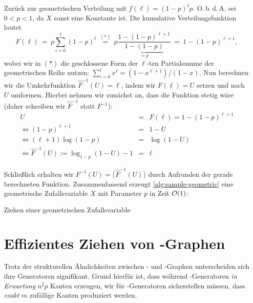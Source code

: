 Zurück  zur geometrischen Verteilung mit $f(\ell) = (1-p)^\ell p$.
O.\,b.\,d.\,A. sei $0 < p < 1$, da $X$ sonst eine Konstante ist.
Die kumulative Verteilungsfunktion lautet
\begin{equation}
    F(\ell)
    \ =\ p \sum_{i=0}^\ell (1-p)^\ell
    \ \stackrel{(*)}{=} \ p \frac{1 - (1-p)^{\ell+1}}{\underbrace{1 - (1-p)}_{=p}}
    \ = \ 1 - (1-p)^{\ell+1},
\end{equation}
wobei wir in $(*)$ die geschlossene Form der $\ell$-ten Partialsumme der geometrischen Reihe nutzen: $\sum_{i=0}^\ell x^\ell = (1 - x^{\ell+1})/(1 - x)$.
Nun berechnen wir die Umkehrfunktion $\hat F^{-1}(U) = \ell$, indem wir $F(\ell) = U$ setzen und nach $U$ umformen.
Hierbei nehmen wir zunächst an, dass die Funktion stetig wäre (daher schreiben wir $\hat F ^{-1}$ statt $F^{-1}$):
\begin{eqnarray}
    U &=& F(\ell) = 1 - (1-p)^{\ell+1} \\
    \Leftrightarrow (1-p)^{\ell+1} &=& 1 - U \\
    \Leftrightarrow  (\ell+1) \log(1-p)  &=& \log(1 - U) \\
    \Leftrightarrow  \hat F^{-1}(U) := \log_{1-p}(1 - U) - 1 &=& \ell \label{eq:inverse-hat}
\end{eqnarray}

Schließlich erhalten wir $F^{-1}(U) = \lceil \hat F^{-1} (U) \rceil$ durch Aufrunden der gerade berechneten Funktion.
Zusammenfassend erzeugt \cref{alg:sample-geometric} eine geometrische Zufallsvariable $X$ mit Parameter $p$ in Zeit $\mathcal{O}\!\left(1\right)$:

\begin{algorithm}[H]
    \Else{$U \gets \text{ziehe uniform aus $[0, 1)$}$\;
    Gebe $\lceil \log_{1-p}(1 - U) - 1\rceil$ zurück}
    \caption{Ziehen einer geometrischen Zufallsvariable}
    \label{alg:sample-geometric}
\end{algorithm}

\bigskip
\bigskip

\section{Effizientes Ziehen von \Gnm-Graphen}\label{sec:sampling_gnm}
Trotz der strukturellen Ähnlichkeiten zwischen \Gnp- und \Gnm-Graphen unterscheiden sich ihre Generatoren signifikant.
Grund hierfür ist, dass während \Gnp-Generatoren \emph{in Erwartung} $n^2p$ Kanten erzeugen, wir für \Gnm-Generatoren sicherstellen müssen, dass \emph{exakt} $m$ zufällige Kanten produziert werden.

